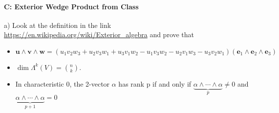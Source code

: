 \documentclass[12pt]{article}
\begin{document}
\paragraph{C: Exterior Wedge Product from Class}
\begin{itemize}
{\item a) Look at the definition in the link \url{https://en.wikipedia.org/wiki/Exterior_algebra} and prove that
\begin{itemize}
    \item 
${\displaystyle \mathbf {u} \wedge \mathbf {v} \wedge \mathbf {w} =(u_{1}v_{2}w_{3}+u_{2}v_{3}w_{1}+u_{3}v_{1}w_{2}-u_{1}v_{3}w_{2}-u_{2}v_{1}w_{3}-u_{3}v_{2}w_{1})(\mathbf {e} _{1}\wedge \mathbf {e} _{2}\wedge \mathbf {e} _{3})} $

\item 
 ${\displaystyle \dim \Lambda ^{k}(V)={\binom {n}{k}}.}$
 
 \item In characteristic 0, the 2-vector $\alpha$ has rank p if and only if
${\displaystyle {\underset {p}{\underbrace {\alpha \wedge \cdots \wedge \alpha } }}\not =0}$ and $\underset{p+1}{\underbrace{\alpha\wedge\cdots\wedge\alpha}}= 0$


\end{itemize}

}




\end{itemize}

\end{document}
